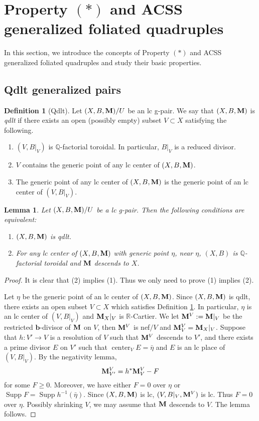 \documentclass[11pt]{amsart}
\numberwithin{equation}{section}
\newcommand{\bb}{\bm{b}}
\newcommand{\Mm}{{\bf{M}}}
\newcommand{\Qq}{\mathbb{Q}}
\newcommand{\Rr}{\mathbb{R}}
\newcommand{\Center}{\operatorname{center}}
\newcommand{\Supp}{\operatorname{Supp}}
\newtheorem{lem}[thm]{Lemma}
\theoremstyle{definition}
\newtheorem{defn}[thm]{Definition}
\theoremstyle{definition}
\theoremstyle{definition}
\begin{document}
\section{Property \texorpdfstring{$(*)$}{} and ACSS generalized foliated quadruples}\label{sec: acss gfq}

In this section, we introduce the concepts of Property $(*)$ and ACSS generalized foliated quadruples and study their basic properties.



\subsection{Qdlt generalized pairs}
\begin{defn}[Qdlt]\label{defn: qdlt}
Let $(X,B,\Mm)/U$ be an lc g-pair. We say that $(X,B,\Mm)$ is \emph{qdlt} if there exists an open (possibly empty) subset $V\subset X$ satisfying the following.
\begin{enumerate}
    \item $(V,B|_V)$ is $\Qq$-factorial toroidal. In particular, $B|_V$ is a reduced divisor. 
    \item $V$ contains the generic point of any lc center of $(X,B,\Mm)$.
    \item The generic point of any lc center of $(X,B,\Mm)$ is the generic point of an lc center of $(V,B|_V)$.
\end{enumerate}
\end{defn}

\begin{lem}\label{lem: equi def qdlt}
    Let $(X,B,\Mm)/U$ be a lc g-pair. Then the following conditions are equivalent:
    \begin{enumerate}
        \item $(X,B,\Mm)$ is qdlt.
        \item For any lc center of $(X,B,\Mm)$ with generic point $\eta$, near $\eta$, $(X,B)$ is $\Qq$-factorial toroidal and $\Mm$ descends to $X$.
    \end{enumerate}
\end{lem}
\begin{proof}
It is clear that (2) implies (1). Thus we only need to prove (1) implies (2).
    
Let $\eta$ be the generic point of an lc center of $(X,B,\Mm)$. Since $(X,B,\Mm)$ is qdlt, there exists an open subset $V\subset X$ which satisfies Definition \ref{defn: qdlt}. In particular, $\eta$ is an lc center of $(V,B|_V)$ and $\Mm_X|_V$ is $\Rr$-Cartier. We let $\Mm^V:=\Mm|_V$ be the restricted $\bb$-divisor of $\Mm$ on $V$, then $\Mm^V$ is nef$/V$ and $\Mm^V_V=\Mm_X|_V$. Suppose that $h: V'\rightarrow V$ is a resolution of $V$ such that $\Mm^V$ descends to $V'$, and there exists a prime divisor $E$ on $V'$ such that $\Center_{V}E=\bar\eta$ and $E$ is an lc place of $(V,B|_V)$. By the negativity lemma,
$$\Mm^V_{V'}=h^*\Mm^V_V-F$$
for some $F\geq 0$. Moreover, we have either $F=0$ over $\eta$ or $\Supp F=\Supp h^{-1}(\bar\eta)$. Since $(X,B,\Mm)$ is lc, $(V,B|_V,\Mm^V)$ is lc. Thus  $F=0$ over $\eta$. Possibly shrinking $V$, we may assume that $\Mm$ descends to $V$. The lemma follows.
\end{proof}
\end{document}
